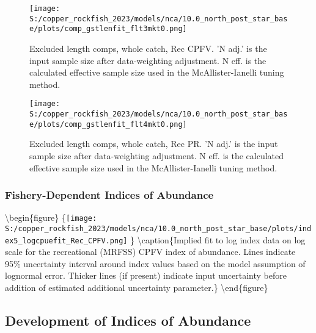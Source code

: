 \documentclass[11pt,
  letterpaper,
]{article}
\begin{document}
\begin{figure}
{\centering
\texttt{[image: S:/copper\_rockfish\_2023/models/nca/10.0\_north\_post\_star\_base/plots/comp\_gstlenfit\_flt3mkt0.png]}
}
\caption{Excluded length comps, whole catch, Rec CPFV.  'N adj.' is the input sample size after data-weighting adjustment. N eff. is the calculated effective sample size used in the McAllister-Ianelli tuning method.\label{fig:comp-gstlenfit-flt3mkt0}}
\end{figure}

\begin{figure}
{\centering
\texttt{[image: S:/copper\_rockfish\_2023/models/nca/10.0\_north\_post\_star\_base/plots/comp\_gstlenfit\_flt4mkt0.png]}
}
\caption{Excluded length comps, whole catch, Rec PR.  'N adj.' is the input sample size after data-weighting adjustment. N eff. is the calculated effective sample size used in the McAllister-Ianelli tuning method.\label{fig:comp-gstlenfit-flt4mkt0}}
\end{figure}

\newpage

\subsubsection{Fishery-Dependent Indices of Abundance}\label{fishery-dependent-indices-of-abundance}

\textbackslash begin\{figure\} \{\centering \texttt{[image: S:/copper\_rockfish\_2023/models/nca/10.0\_north\_post\_star\_base/plots/index5\_logcpuefit\_Rec\_CPFV.png]} \} \textbackslash caption\{Implied fit to log index data on log scale for the recreational (MRFSS) CPFV index of abundance. Lines indicate 95\% uncertainty interval around index values based on the model assumption of lognormal error. Thicker lines (if present) indicate input uncertainty before addition of estimated additional uncertainty parameter.\label{fig:mrfss-cpfv-index-fit}\} \textbackslash end\{figure\}

\pagebreak

\subsection{Development of Indices of Abundance}\label{development-of-indices-of-abundance}
\end{document}
